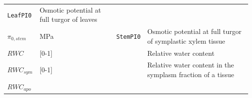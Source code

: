 \documentclass[]{book}
\begin{document}
\begin{longtable}[]{@{}llll@{}}
\begin{minipage}[t]{0.12\columnwidth}
\texttt{LeafPI0}\strut
\end{minipage} & \begin{minipage}[t]{0.45\columnwidth}\raggedright\strut
Osmotic potential at full turgor of leaves\strut
\end{minipage}\tabularnewline
\begin{minipage}[t]{0.11\columnwidth}\raggedright\strut
\(\pi_{0,stem}\)\strut
\end{minipage} & \begin{minipage}[t]{0.10\columnwidth}\raggedright\strut
MPa\strut
\end{minipage} & \begin{minipage}[t]{0.12\columnwidth}\raggedright\strut
\texttt{StemPI0}\strut
\end{minipage} & \begin{minipage}[t]{0.45\columnwidth}\raggedright\strut
Osmotic potential at full turgor of symplastic xylem tissue\strut
\end{minipage}\tabularnewline
\begin{minipage}[t]{0.11\columnwidth}\raggedright\strut
\(RWC\)\strut
\end{minipage} & \begin{minipage}[t]{0.10\columnwidth}\raggedright\strut
{[}0-1{]}\strut
\end{minipage} & \begin{minipage}[t]{0.12\columnwidth}\raggedright\strut
\strut
\end{minipage} & \begin{minipage}[t]{0.45\columnwidth}\raggedright\strut
Relative water content\strut
\end{minipage}\tabularnewline
\begin{minipage}[t]{0.11\columnwidth}\raggedright\strut
\(RWC_{sym}\)\strut
\end{minipage} & \begin{minipage}[t]{0.10\columnwidth}\raggedright\strut
{[}0-1{]}\strut
\end{minipage} & \begin{minipage}[t]{0.12\columnwidth}\raggedright\strut
\strut
\end{minipage} & \begin{minipage}[t]{0.45\columnwidth}\raggedright\strut
Relative water content in the symplasm fraction of a tissue\strut
\end{minipage}\tabularnewline
\begin{minipage}[t]{0.11\columnwidth}\raggedright\strut
\(RWC_{apo}\)\strut
\end{minipage} & \begin{minipage}[t]{0.10\columnwidth}\raggedright\strut

\end{minipage}
\end{longtable}
\end{document}
